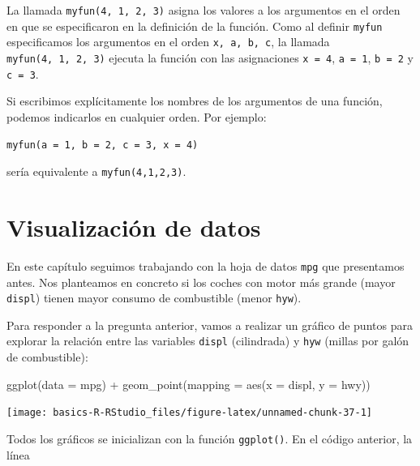 \documentclass[
  title=normal,
  notoc,
  bib=normal]{mnye}
\newenvironment{Shaded}{\begin{snugshade}}{\end{snugshade}}
\newcommand{\AttributeTok}[1]{\textcolor[rgb]{0.77,0.63,0.00}{#1}}
\newcommand{\FunctionTok}[1]{\textcolor[rgb]{0.00,0.00,0.00}{#1}}
\newcommand{\NormalTok}[1]{#1}
\newcommand{\SpecialCharTok}[1]{\textcolor[rgb]{0.00,0.00,0.00}{#1}}
\begin{document}
\begin{infobox}
La llamada \texttt{myfun(4,\ 1,\ 2,\ 3)} asigna los valores a los argumentos en el orden en que se especificaron en la definición de la función. Como al definir \texttt{myfun} especificamos los argumentos en el orden \texttt{x,\ a,\ b,\ c}, la llamada \texttt{myfun(4,\ 1,\ 2,\ 3)} ejecuta la función con las asignaciones \texttt{x\ =\ 4}, \texttt{a\ =\ 1}, \texttt{b\ =\ 2} y \texttt{c\ =\ 3}.

Si escribimos explícitamente los nombres de los argumentos de una función, podemos indicarlos en cualquier orden. Por ejemplo:

\texttt{myfun(a\ =\ 1,\ b\ =\ 2,\ c\ =\ 3,\ x\ =\ 4)}

sería equivalente a \texttt{myfun(4,1,2,3)}.

\end{infobox}

\hypertarget{plots}{%
\section{Visualización de datos}\label{plots}}

En este capítulo seguimos trabajando con la hoja de datos \texttt{mpg} que presentamos antes.
Nos planteamos en concreto si los coches con motor más grande (mayor \texttt{displ}) tienen mayor consumo de combustible (menor \texttt{hyw}).

Para responder a la pregunta anterior, vamos a realizar un gráfico de puntos para explorar la relación entre las variables \texttt{displ} (cilindrada) y \texttt{hyw} (millas por galón de combustible):

\begin{Shaded}
\begin{Highlighting}[]
\FunctionTok{ggplot}\NormalTok{(}\AttributeTok{data =}\NormalTok{ mpg) }\SpecialCharTok{+} 
    \FunctionTok{geom\_point}\NormalTok{(}\AttributeTok{mapping =} \FunctionTok{aes}\NormalTok{(}\AttributeTok{x =}\NormalTok{ displ, }\AttributeTok{y =}\NormalTok{ hwy)) }
\end{Highlighting}
\end{Shaded}

\begin{center}\texttt{[image: basics-R-RStudio\_files/figure-latex/unnamed-chunk-37-1]} \end{center}

Todos los gráficos se inicializan con la función \texttt{ggplot()}. En el código anterior, la línea
\end{document}
